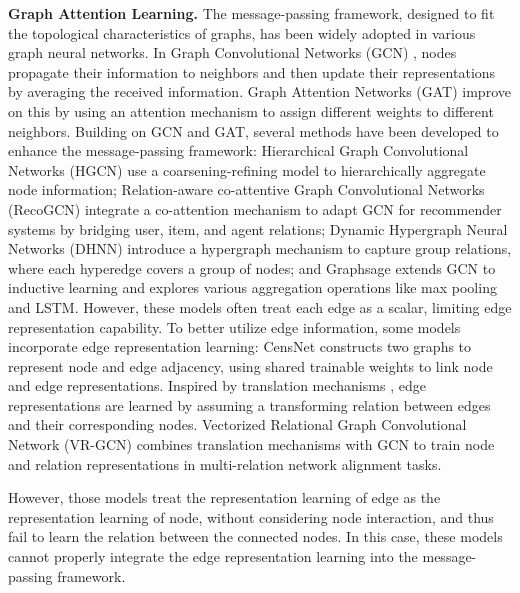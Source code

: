 \par\smallskip\noindent
\textbf{Graph Attention Learning.} 
The message-passing framework, designed to fit the topological characteristics of graphs, has been widely adopted in various graph neural networks. 
In Graph Convolutional Networks (GCN) \cite{kipf2016semi}, nodes propagate their information to neighbors and then update their representations by averaging the received information. 
Graph Attention Networks (GAT) \cite{velivckovic2017graph} improve on this by using an attention mechanism to assign different weights to different neighbors. 
Building on GCN and GAT, several methods have been developed to enhance the message-passing framework: Hierarchical Graph Convolutional Networks (HGCN) \cite{hu2019hierarchical} use a coarsening-refining model to hierarchically aggregate node information; 
Relation-aware co-attentive Graph Convolutional Networks (RecoGCN) \cite{xu2019relation} integrate a co-attention mechanism to adapt GCN for recommender systems by bridging user, item, and agent relations; 
Dynamic Hypergraph Neural Networks (DHNN) \cite{jiang2019dynamic} introduce a hypergraph mechanism to capture group relations, where each hyperedge covers a group of nodes; 
and Graphsage \cite{hamilton2017inductive} extends GCN to inductive learning and explores various aggregation operations like max pooling and LSTM. 
However, these models often treat each edge as a scalar, limiting edge representation capability. 
To better utilize edge information, some models incorporate edge representation learning: 
CensNet \cite{pan2019learning} constructs two graphs to represent node and edge adjacency, using shared trainable weights to link node and edge representations. 
Inspired by translation mechanisms \cite{jiang2019censnet}, edge representations are learned by assuming a transforming relation between edges and their corresponding nodes. 
Vectorized Relational Graph Convolutional Network (VR-GCN) \cite{ye2019vectorized} combines translation mechanisms with GCN to train node and relation representations in multi-relation network alignment tasks.

However, those models treat the representation learning of edge as the representation learning of node, without considering node interaction, and thus fail to learn the relation between the connected nodes. 
In this case, these models cannot properly integrate the edge representation learning into the message-passing framework.


